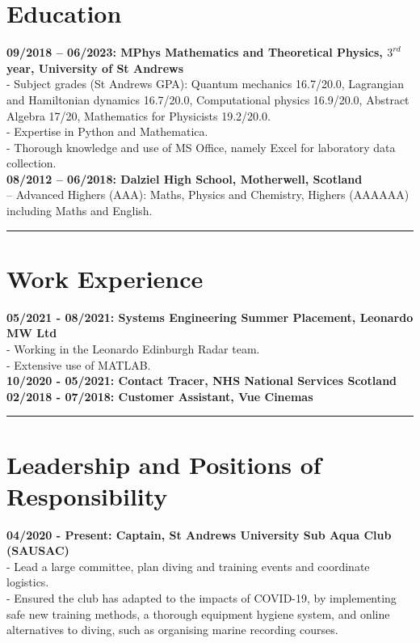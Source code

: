 %
%


%
%
\section*{Education}
\textbf{09/2018 -- 06/2023: MPhys Mathematics and Theoretical Physics, $3^{rd}$ year, University of St Andrews}\\
 - Subject grades (St Andrews GPA): Quantum mechanics 16.7/20.0, Lagrangian and Hamiltonian dynamics 16.7/20.0, Computational physics 16.9/20.0, Abstract Algebra 17/20, Mathematics for Physicists 19.2/20.0.\\
 - Expertise in Python and Mathematica.\\
 - Thorough knowledge and use of MS Office, namely Excel for laboratory data collection.\\

\textbf{08/2012 -- 06/2018: Dalziel High School, Motherwell, Scotland}\\
 -- Advanced Highers (AAA): Maths, Physics and Chemistry, Highers (AAAAAA) including Maths and English.

\noindent\rule[0.5ex]{\linewidth}{1pt}

%
%
\section*{Work Experience}
\textbf{05/2021 - 08/2021: Systems Engineering Summer Placement, Leonardo MW Ltd}\\
 - Working in the Leonardo Edinburgh Radar team.\\
 - Extensive use of MATLAB.\\

\textbf{10/2020 - 05/2021: Contact Tracer, NHS National Services Scotland}\\
\textbf{02/2018 - 07/2018: Customer Assistant, Vue Cinemas}\\
\noindent\rule[0.5ex]{\linewidth}{1pt}

%
%
\section*{Leadership and Positions of Responsibility}
\textbf{04/2020 - Present: Captain, St Andrews University Sub Aqua Club (SAUSAC)}\\
 - Lead a large committee, plan diving and training events and coordinate logistics.\\
 - Ensured the club has adapted to the impacts of COVID-19, by implementing safe new training methods, a thorough equipment hygiene system, and online alternatives to diving, such as organising marine recording courses.\\


